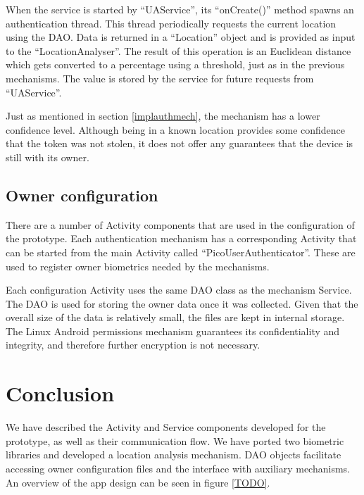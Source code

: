 When the service is started by ``UAService'', its ``onCreate()'' method spawns an authentication thread. This thread periodically requests the current location using the DAO. Data is returned in a ``Location'' object and is provided as input to the ``LocationAnalyser''. The result of this operation is an Euclidean distance which gets converted to a percentage using a threshold, just as in the previous mechanisms. The value is stored by the service for future requests from ``UAService''.

Just as mentioned in section \ref{implauthmech}, the mechanism has a lower confidence level. Although being in a known location provides some confidence that the token was not stolen, it does not offer any guarantees that the device is still with its owner.

\subsection{Owner configuration}
There are a number of Activity components that are used in the configuration of the prototype. Each authentication mechanism has a corresponding Activity that can be started from the main Activity called ``PicoUserAuthenticator''. These are used to register owner biometrics needed by the mechanisms.

Each configuration Activity uses the same DAO class as the mechanism Service. The DAO is used for storing the owner data once it was collected. Given that the overall size of the data is relatively small, the files are kept in internal storage. The Linux Android permissions mechanism guarantees its confidentiality and integrity, and therefore further encryption is not necessary.

\section{Conclusion}
We have described the Activity and Service components developed for the prototype, as well as their communication flow. We have ported two biometric libraries and developed a location analysis mechanism. DAO objects facilitate accessing owner configuration files and the interface with auxiliary mechanisms. An overview of the app design can be seen in figure \ref{TODO}.


